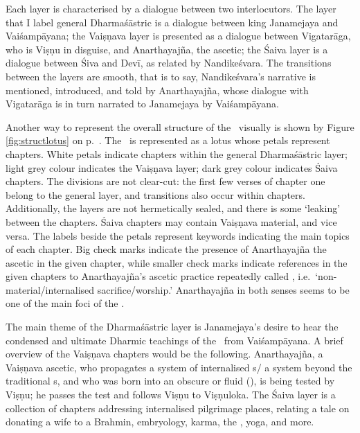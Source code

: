 Each layer is characterised by a dialogue between
two interlocutors. The layer that I label general 
Dharmaśāstric is a dialogue between king Janamejaya and
Vaiśampāyana; the Vaiṣṇava layer is presented as
a dialogue between Vigatarāga, who is
Viṣṇu in disguise, and Anarthayajña,\label{anarthayajna_person} the ascetic;
the Śaiva layer is a dialogue between Śiva and Devī,
as related by Nandikeśvara. The transitions between the
layers are smooth, that is to say, Nandikeśvara's narrative
is mentioned, introduced, and told by Anarthayajña, whose dialogue
with Vigatarāga is in turn narrated to Janamejaya by Vaiśampāyana.

Another way to represent the overall structure of the \VSS\
visually is shown by Figure \ref{fig:structlotus} 
on p.~\pageref{fig:structlotus}. 
The \VSS\ is represented
as a lotus whose petals represent chapters. White petals indicate chapters within
the general Dharmaśāstric layer; light grey colour
indicates the Vaiṣṇava layer; dark grey colour indicates
Śaiva chapters. The divisions are not clear-cut: 
the first few verses of chapter one belong to
the general layer, and transitions also occur within chapters.
Additionally, the layers are not hermetically
sealed, and there is some `leaking' between the chapters.
Śaiva chapters may contain Vaiṣṇava material, and vice versa.
The labels beside the petals represent keywords
indicating the main topics of each chapter.
Big check marks indicate the presence of Anarthayajña the ascetic in
the given chapter, while smaller check marks indicate
references in the given chapters to Anarthayajña's
ascetic practice repeatedly called , 
i.e.\ `non-material\thinspace /\thinspace internali\-sed sacrifice/worship.'\label{nonmaterial}
Anarthayajña in both senses seems to be one of the 
main foci of the \VSS.

The main theme of the Dharmaśāstric layer is Janamejaya's desire 
to hear the condensed and ultimate Dharmic teachings of the \MBh\ from Vaiśampāyana.
A brief overview of the Vaiṣṇava chapters would be the following.
An\-artha\-yajña, a Vaiṣṇava ascetic, who propagates
a system of internalised s\thinspace /\thinspace
a system beyond the traditional \skt{āśrama}s, 
and who was born into an obscure or fluid  
(),
is being tested by Viṣṇu; he passes the test
and follows Viṣṇu to Viṣṇuloka.
The Śaiva layer is a collection of chapters addressing internalised
pilgrimage places, relating a tale on donating a wife to a Brahmin,
embryology, karma, the \skt{jīva}, yoga, and more.

